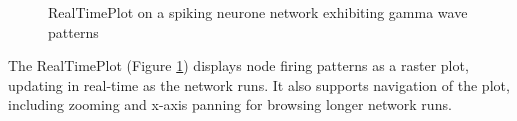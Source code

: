 \documentclass{acm_proc_article-sp}
\begin{document}
{\begin{figure}[t]
\centering
{}
\caption{RealTimePlot on a spiking neurone network exhibiting gamma wave patterns}
\label{fig:ui:realtimeplot}
\end{figure}
The RealTimePlot (Figure \ref{fig:ui:realtimeplot}) displays node firing patterns as a raster plot, updating in real{}-time as the network runs. It also supports navigation of the plot, including zooming and x{}-axis panning for browsing longer network runs.
}
\end{document}
